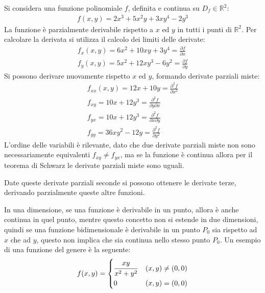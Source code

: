 \documentclass{article}
\numberwithin{equation}{subsection}
\begin{document}
Si considera una funzione polinomiale $f$, definita e continua su $D_f\in\mathbb{R}^2$:
\begin{gather*}
    f(x,y)=2x^3+5x^2y+3xy^4-2y^3
\end{gather*}
La funzione è parzialmente derivabile rispetto a $x$ ed $y$ in tutti i punti di $\mathbb{R}^2$. Per calcolare la derivata si utilizza il calcolo dei limiti delle derivate:
\begin{gather*}
    f_x(x,y)=6x^2+10xy+3y^4=\displaystyle\frac{\partial f}{\partial x}\\
    f_y(x,y)=5x^2+12xy^3-6y^2=\displaystyle\frac{\partial f}{\partial y}
\end{gather*}
Si possono derivare nuovamente rispetto $x$ ed $y$, formando derivate parziali miste:
\begin{gather*}
    f_{xx}(x,y)=12x+10y=\displaystyle\frac{\partial^2 f}{\partial x^2}\\
    f_{xy}=10x+12y^3=\displaystyle\frac{\partial^2 f}{\partial y\partial x}\\
    f_{yx}=10x+12y^3=\displaystyle\frac{\partial^2 f}{\partial x\partial y}\\
    f_{yy}=36xy^2-12y=\displaystyle\frac{\partial^2f}{\partial y^2}
\end{gather*}
L'ordine delle variabili è rilevante, dato che due derivate parziali miste non sono necessariamente equivalenti $f_{xy}\neq f_{yx}$, ma se la funzione è continua allora per il teorema di Schwarz le derivate parziali miste sono uguali. 

Date queste derivate parziali seconde si possono ottenere le derivate terze, derivando parzialmente queste altre funzioni. 





In una dimensione, se una funzione è derivabile in un punto, allora è anche continua in quel punto, mentre questo concetto non si estende in due dimensioni, quindi se una funzione bidimensionale è derivabile in un punto $P_0$ sia rispetto ad $x$ che ad $y$, questo non implica che sia continua nello stesso punto $P_0$. 
Un esempio di una funzione del genere è la seguente:
\begin{gather*}
    f(x,y)=\begin{cases}
        \displaystyle\frac{\strut xy}{\strut x^2+y^2}&(x,y)\neq(0,0)\\
        0&(x,y)=(0,0)
    \end{cases}
\end{gather*}
\end{document}
